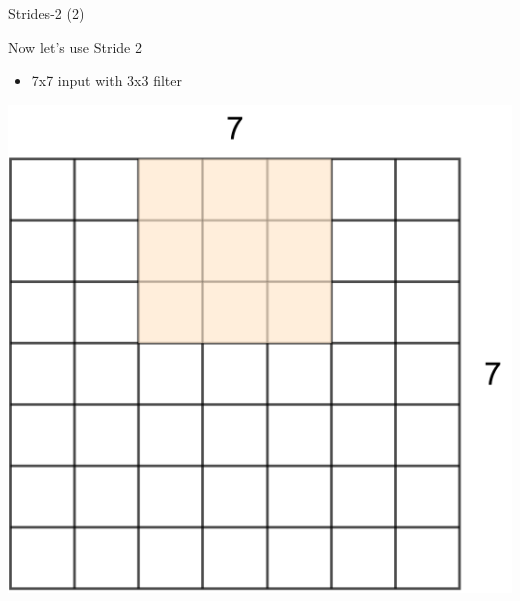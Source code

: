 \documentclass[default, aspectratio=169]{beamer}
\begin{document}
	\begin{frame}{Strides-2 (2)}
		\vspace{0.5cm}
		
		\normalsize Now let's use Stride 2
		\begin{itemize}
			\item 7x7 input with 3x3 filter
		\end{itemize}
		
		\centering
		\includegraphics[keepaspectratio, scale=0.25]{pic/Stride7.png}
	\end{frame}
		
\end{document}
